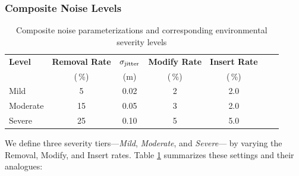 \subsubsection{Composite Noise Levels}
\label{sec:composite_noise}
\begin{table}[H]
	\centering
	\caption{Composite noise parameterizations and corresponding environmental severity levels}
	\label{tab:noise_levels}
	\begin{tabular}{l c c c c c c}
		\toprule
		\textbf{Level}   & \textbf{Removal Rate} & \(\sigma_{\rm jitter}\) & \textbf{Modify Rate} &  \textbf{Insert Rate} \\
		& (\,\%)                & (m)                     & (\,\%)              & (\,\%)          \\
		\midrule
		Mild      & 5   & 0.02 & 2   & 2.0 \\
		Moderate  & 15  & 0.05 & 3   & 2.0 \\
		Severe    & 25  & 0.10 & 5   & 5.0 \\
		\bottomrule
	\end{tabular}
\end{table}


We define three severity tiers—\textit{Mild}, \textit{Moderate}, and \textit{Severe}— by varying the Removal, Modify, and Insert rates.  Table \ref{tab:noise_levels} summarizes these settings and their analogues:



